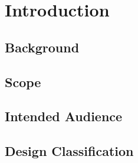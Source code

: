 

\setcounter{section}{0}
\section{Introduction}
\bigskip

\subsection{Background}

\subsection{Scope}

\subsection{Intended Audience}

\subsection{Design Classification}















